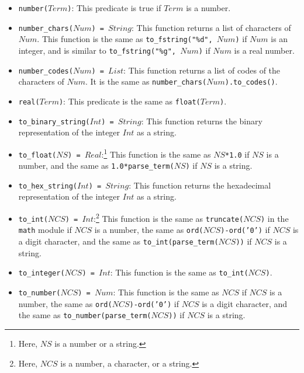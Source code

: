 \begin{itemize}
\item \texttt{number($Term$)}: This predicate is true if $Term$ is a number.
\item \texttt{number\_chars($Num$) = $String$}: This function returns a list of characters of $Num$. This function is the same as \texttt{to\_fstring("\%d", $Num$)} if $Num$ is an integer, and is similar to \texttt{to\_fstring("\%g", $Num$)} if $Num$ is a real number.
\item \texttt{number\_codes($Num$) = $List$}: This function returns a list of codes of the characters of $Num$. It is the same as \texttt{number\_chars($Num$).to\_codes()}.
\item \texttt{real($Term$)}: This predicate is the same as \texttt{float($Term$)}.
\item \texttt{to\_binary\_string($Int$) = $String$}: This function returns the binary representation of the integer $Int$ as a string.
\item \texttt{to\_float($NS$) = $Real$}:\footnote{Here, $NS$ is a number or a string.} This function is the same as \texttt{$NS$*1.0} if $NS$ is a number, and the same as \texttt{1.0*parse\_term($NS$)} if $NS$ is a string.
\item \texttt{to\_hex\_string($Int$) = $String$}: This function returns the hexadecimal representation of the integer $Int$ as a string.
\item \texttt{to\_int($NCS$) = $Int$}:\footnote{Here, $NCS$ is a number, a character, or a string.} This function is the same as \texttt{truncate($NCS$)} in the \texttt{math} module if $NCS$ is a number, the same as \texttt{ord($NCS$)-ord('0')} if $NCS$ is a digit character, and the same as \texttt{to\_int(parse\_term($NCS$))} if $NCS$ is a string.
\item \texttt{to\_integer($NCS$) = $Int$}: This function is the same as \texttt{to\_int($NCS$)}.
\item \texttt{to\_number($NCS$) = $Num$}: This function is the same as $NCS$ if $NCS$ is a number, the same as \texttt{ord($NCS$)-ord('0')} if $NCS$ is a digit character, and the same as \texttt{to\_number(parse\_term($NCS$))} if $NCS$ is a string.

\end{itemize}
